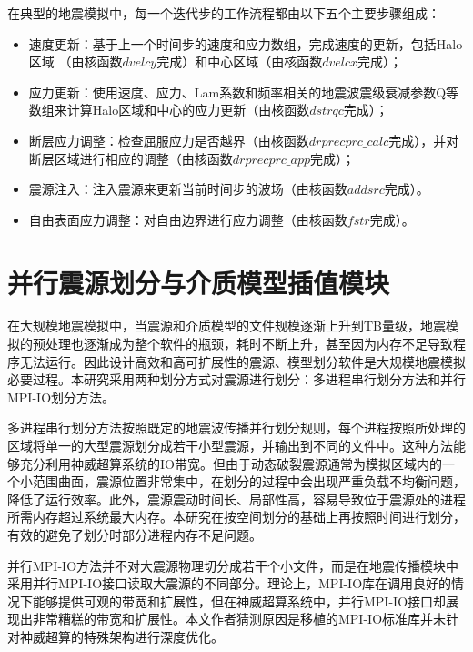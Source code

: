 \documentclass[degree=doctor]{thuthesis}
\begin{document}
在典型的地震模拟中，每一个迭代步的工作流程都由以下五个主要步骤组成：

\begin{itemize}
\item 速度更新：基于上一个时间步的速度和应力数组，完成速度的更新，包括Halo区域 （由核函数$dvelcy$完成）和中心区域（由核函数$dvelcx$完成）；

\item 应力更新：使用速度、应力、Lam系数和频率相关的地震波震级衰减参数Q等数组来计算Halo区域和中心的应力更新（由核函数$dstrqc$完成）；

\item 断层应力调整：检查屈服应力是否越界（由核函数$drprecprc\_calc$完成），并对断层区域进行相应的调整（由核函数$drprecprc\_app$完成）；

\item 震源注入：注入震源来更新当前时间步的波场（由核函数$addsrc$完成）。

\item 自由表面应力调整：对自由边界进行应力调整（由核函数$fstr$完成）。
\end{itemize}

\section{并行震源划分与介质模型插值模块}
\label{sub:并行震源划分与介质模型插值模块}
在大规模地震模拟中，当震源和介质模型的文件规模逐渐上升到TB量级，地震模拟的预处理也逐渐成为整个软件的瓶颈，耗时不断上升，甚至因为内存不足导致程序无法运行。因此设计高效和高可扩展性的震源、模型划分软件是大规模地震模拟必要过程。本研究采用两种划分方式对震源进行划分：多进程串行划分方法和并行MPI-IO划分方法。

多进程串行划分方法按照既定的地震波传播并行划分规则，每个进程按照所处理的区域将单一的大型震源划分成若干小型震源，并输出到不同的文件中。这种方法能够充分利用神威超算系统的IO带宽。但由于动态破裂震源通常为模拟区域内的一个小范围曲面，震源位置非常集中，在划分的过程中会出现严重负载不均衡问题，降低了运行效率。此外，震源震动时间长、局部性高，容易导致位于震源处的进程所需内存超过系统最大内存。本研究在按空间划分的基础上再按照时间进行划分，有效的避免了划分时部分进程内存不足问题。

并行MPI-IO方法并不对大震源物理切分成若干个小文件，而是在地震传播模块中采用并行MPI-IO接口读取大震源的不同部分。理论上，MPI-IO库在调用良好的情况下能够提供可观的带宽和扩展性，但在神威超算系统中，并行MPI-IO接口却展现出非常糟糕的带宽和扩展性。本文作者猜测原因是移植的MPI-IO标准库并未针对神威超算的特殊架构进行深度优化。
\end{document}
